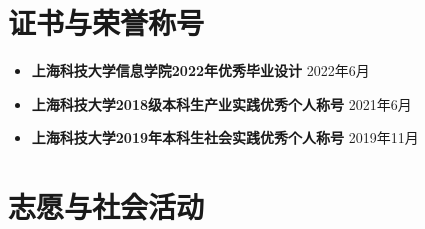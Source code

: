 \documentclass[a4paper,10pt]{ctexart} %
\begin{document}
\newpage



\section{证书与荣誉称号}

    \begin{itemize}
        \item \textbf{上海科技大学信息学院2022年优秀毕业设计} \hfill \quad 2022年6月
        \item \textbf{上海科技大学2018级本科生产业实践优秀个人称号} \hfill \quad 2021年6月
        \item \textbf{上海科技大学2019年本科生社会实践优秀个人称号} \hfill \quad 2019年11月
    \end{itemize}



\section{志愿与社会活动}
\end{document}
